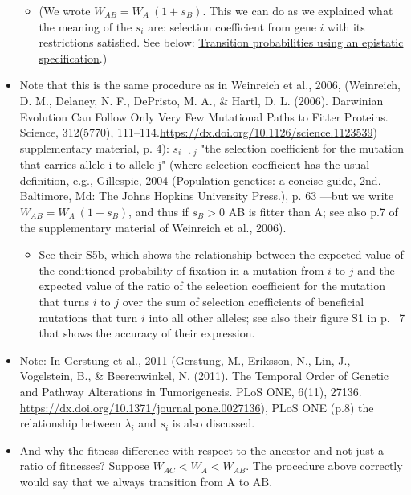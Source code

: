 \documentclass[11pt]{article}
\begin{document}
\begin{itemize}
\begin{itemize}
\item (We wrote \(W_{AB} = W_A \ (1 + s_B)\). This we can do as we explained what the meaning of the \(s_i\) are: selection coefficient from gene \(i\) with its restrictions satisfied. See below: \hyperref[sec:orge68f649]{Transition probabilities using an epistatic specification}.)
\end{itemize}

\item Note that this is the same procedure as in Weinreich et al., 2006, (Weinreich, D. M., Delaney, N. F., DePristo, M. A., \& Hartl, D. L. (2006). Darwinian Evolution Can Follow Only Very Few Mutational Paths to Fitter Proteins. Science, 312(5770), 111–114.\url{https://dx.doi.org/10.1126/science.1123539}) supplementary material, p. 4): \(s_{i \rightarrow j}\) "the selection coefficient for the mutation that carries allele i to allele j" (where selection coefficient has the usual definition, e.g., Gillespie, 2004 (Population genetics: a concise guide, 2nd. Baltimore, Md: The Johns Hopkins University Press.), p. 63 ---but we write \(W_{AB} = W_A \ (1 + s_B)\), and thus if \(s_B > 0\) AB is fitter than A; see also p.7 of the supplementary material of Weinreich et al., 2006).
\begin{itemize}
\item See their S5b, which shows the relationship between the expected value of the conditioned probability of fixation in a mutation from \(i\) to \(j\) and the expected value of the ratio of the selection coefficient for the mutation that turns \(i\) to \(j\) over the sum of selection coefficients of beneficial mutations that turn \(i\) into all other alleles; see also their figure S1 in p.~ 7 that shows the accuracy of their expression.
\end{itemize}

\item Note: In Gerstung et al., 2011 (Gerstung, M., Eriksson, N., Lin, J., Vogelstein, B., \& Beerenwinkel, N. (2011). The Temporal Order of Genetic and Pathway Alterations in Tumorigenesis. PLoS ONE, 6(11), 27136. \url{https://dx.doi.org/10.1371/journal.pone.0027136}), PLoS ONE (p.8) the relationship between \(\lambda_i\) and \(s_i\) is also discussed.

\item And why the fitness difference with respect to the ancestor and not just a  ratio of fitnesses? Suppose \(W_{AC} < W_A < W_{AB}\). The procedure above  correctly would say that we always transition from A to AB.


\end{itemize}
\end{document}
